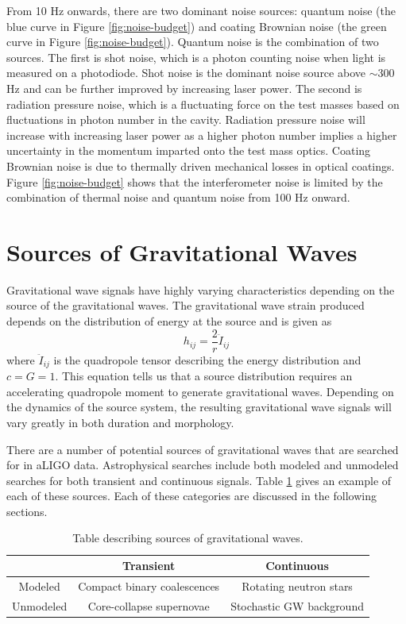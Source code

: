 From 10 Hz onwards, there are two dominant noise sources: quantum noise 
(the blue curve in Figure \ref{fig:noise-budget}) 
and coating Brownian noise (the green curve in Figure \ref{fig:noise-budget}). 
Quantum noise is the combination of two sources. 
The first is shot noise, which is a photon counting noise when light is measured 
on a photodiode. Shot noise is the dominant noise source above $\sim$300 Hz and 
can be further improved by increasing laser power. 
The second is radiation pressure noise, which is a fluctuating 
force on the test masses based on fluctuations in photon number in the cavity. 
Radiation pressure noise will increase with increasing laser power as 
a higher photon number implies a higher uncertainty in the momentum 
imparted onto the test mass optics.
Coating Brownian noise is due to thermally driven mechanical losses in optical 
coatings. 
Figure \ref{fig:noise-budget} shows that the interferometer noise is 
limited by the combination of thermal noise and quantum noise from 100 Hz 
onward. 

\section{Sources of Gravitational Waves}

Gravitational wave signals have highly 
varying characteristics depending on the source of the gravitational 
waves. The gravitational wave strain produced depends on the distribution 
of energy at the source and is given as
\begin{equation}
h_{ij} = \frac{2}{r}\ddot{I}_{ij}
\end{equation}
where $\ddot{I}_{ij}$ is the quadropole tensor describing the 
energy distribution and $c=G=1$. This equation tells us that 
a source distribution requires an accelerating quadropole moment to 
generate gravitational waves. Depending on the dynamics of the source 
system, the resulting gravitational wave signals will vary greatly in 
both duration and morphology.

There are a number of potential sources of gravitational waves that are 
searched for in aLIGO data. Astrophysical searches include both modeled and unmodeled 
searches for both transient and continuous signals. Table \ref{tab:sources} 
gives an example of each of these sources. Each of these categories are 
discussed in the following sections.

\begin{table}[!ht]%
  \begin{tabular}{|c|c|c|}
  \hline
    & Transient  & Continuous  \\
  \hline
  Modeled & Compact binary coalescences & Rotating neutron stars  \\
  \hline
  Unmodeled & Core-collapse supernovae & Stochastic GW background \\
  \hline
  \end{tabular}
  \caption[Table of GW sources]{Table describing sources of %
           gravitational waves.}
  \label{tab:sources}
\end{table}

